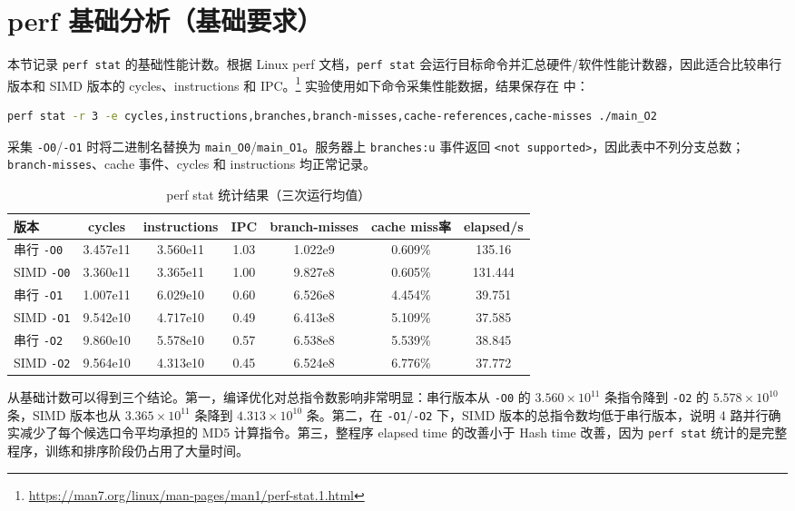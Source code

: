 \documentclass[UTF8,a4paper,12pt]{ctexart}
\begin{document}
\section{perf 基础分析（基础要求）}

本节记录 \texttt{perf stat} 的基础性能计数。根据 Linux perf 文档，\texttt{perf stat} 会运行目标命令并汇总硬件/软件性能计数器，因此适合比较串行版本和 SIMD 版本的 cycles、instructions 和 IPC。\footnote{\url{https://man7.org/linux/man-pages/man1/perf-stat.1.html}} 实验使用如下命令采集性能数据，结果保存在  中：

\begin{lstlisting}[style=cppstyle,caption={perf stat 采集命令},language=bash]
perf stat -r 3 -e cycles,instructions,branches,branch-misses,cache-references,cache-misses ./main_O2
\end{lstlisting}

采集 \texttt{-O0}/\texttt{-O1} 时将二进制名替换为 \texttt{main\_O0}/\texttt{main\_O1}。服务器上 \texttt{branches:u} 事件返回 \texttt{<not supported>}，因此表中不列分支总数；\texttt{branch-misses}、cache 事件、cycles 和 instructions 均正常记录。

\begin{table}[htbp]
    \centering
    \caption{perf stat 统计结果（三次运行均值）}
    \scriptsize
    \begin{tabular}{lcccccc}
        \toprule
        版本 & cycles & instructions & IPC & branch-misses & cache miss率 & elapsed/s \\
        \midrule
        串行 \texttt{-O0} & 3.457e11 & 3.560e11 & 1.03 & 1.022e9 & 0.609\% & 135.16 \\
        SIMD \texttt{-O0} & 3.360e11 & 3.365e11 & 1.00 & 9.827e8 & 0.605\% & 131.444 \\
        串行 \texttt{-O1} & 1.007e11 & 6.029e10 & 0.60 & 6.526e8 & 4.454\% & 39.751 \\
        SIMD \texttt{-O1} & 9.542e10 & 4.717e10 & 0.49 & 6.413e8 & 5.109\% & 37.585 \\
        串行 \texttt{-O2} & 9.860e10 & 5.578e10 & 0.57 & 6.538e8 & 5.539\% & 38.845 \\
        SIMD \texttt{-O2} & 9.564e10 & 4.313e10 & 0.45 & 6.524e8 & 6.776\% & 37.772 \\
        \bottomrule
    \end{tabular}
\end{table}

从基础计数可以得到三个结论。第一，编译优化对总指令数影响非常明显：串行版本从 \texttt{-O0} 的 $3.560\times 10^{11}$ 条指令降到 \texttt{-O2} 的 $5.578\times 10^{10}$ 条，SIMD 版本也从 $3.365\times 10^{11}$ 条降到 $4.313\times 10^{10}$ 条。第二，在 \texttt{-O1}/\texttt{-O2} 下，SIMD 版本的总指令数均低于串行版本，说明 4 路并行确实减少了每个候选口令平均承担的 MD5 计算指令。第三，整程序 elapsed time 的改善小于 Hash time 改善，因为 \texttt{perf stat} 统计的是完整程序，训练和排序阶段仍占用了大量时间。
\end{document}
